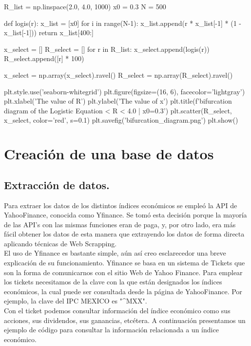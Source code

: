 \documentclass[10pt,a4paper]{article}
\begin{document}
\begin{python}
R_list = np.linspace(2.0, 4.0, 1000)
x0 = 0.3
N = 500

def logis(r):
    x_list = [x0]    
    for i in range(N-1):
        x_list.append(r * x_list[-1] * (1 - x_list[-1]))
    return x_list[400:]

x_select = []
R_select = []
for r in R_list:
    x_select.append(logis(r))
    R_select.append([r] * 100) 
    
x_select = np.array(x_select).ravel()
R_select = np.array(R_select).ravel()

plt.style.use('seaborn-whitegrid')
plt.figure(figsize=(16, 6), facecolor='lightgray')
plt.xlabel('The value of R')
plt.ylabel('The value of x')
plt.title(f'\nThe bifurcation diagram of the Logistic Equation\n{} < R < 4.0  |  x0=0.3\n')
plt.scatter(R_select, x_select, color='red', s=0.1)
plt.savefig('bifurcation_diagram.png')
plt.show()
\end{python}



\section{Creación de una base de datos}

	\subsection{Extracción de datos.}

		Para extraer los datos de los distintos índices económicos se empleó la API de YahooFinance, conocida como Yfinance. Se tomó esta decisión porque la mayoría de las API's con las mismas funciones eran de paga, y, por otro lado, era más fácil obtener los datos de esta manera que extrayendo los datos de forma directa aplicando técnicas de Web Scrapping. \\
		
		El uso de Yfinance es bastante simple, aún así creo esclarecedor una breve explicación de su funcionamiento. Yfinance se basa en un sistema de Tickets que son la forma de comunicarnos con el sitio Web de Yahoo Finance. Para emplear los tickets necesitamos de la clave con la que están designados los índices económicos, la cual puede ser consultada desde la página de YahooFinance. Por ejemplo, la clave del IPC MEXICO es "\^{}MXX". \\
		
		Con el ticket podemos consultar información del índice económico como sus acciones, sus dividendos, sus ganancias, etcétera. A continuación presentamos un ejemplo de código para consultar la información relacionada a un índice económico. \\
		
\end{document}

